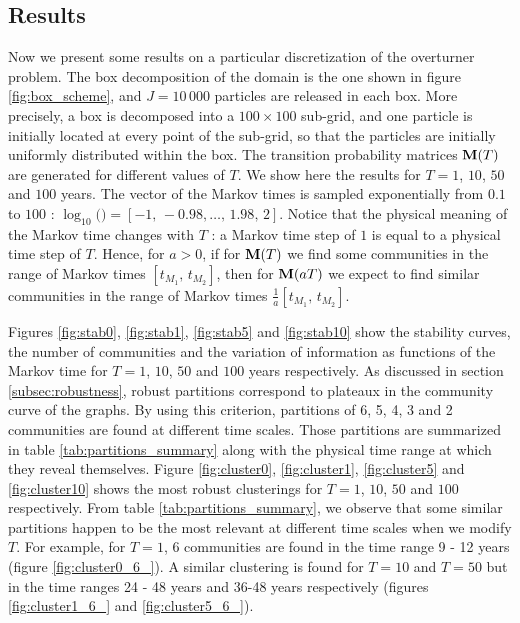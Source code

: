 \subsection{Results}
Now we present some results on a particular discretization of the overturner problem. The box decomposition of the domain is the one shown in figure \ref{fig:box_scheme}, and $J = 10\,000$ particles are released in each box. More precisely, a box is decomposed into a $100 \times 100$ sub-grid, and one particle is initially located at every point of the sub-grid, so that the particles are initially uniformly distributed within the box. The transition probability matrices $\mathbf M(T)$ are generated for different values of $T$. We show here the results for $T = 1$, $10$, $50$ and $100$ years. The vector of the Markov times  is sampled exponentially from $0.1$ to $100$ : $\log_{10}($$) = [-1,\, -0.98, \dots ,\, 1.98,\, 2]$. Notice that the physical meaning of the Markov time changes with $T$ : a Markov time step of $1$ is equal to a physical time step of $T$. Hence, for $a >0$, if for $\mathbf M(T)$ we find some communities in the range of Markov times $[t_{M_1},\, t_{M_2}]$, then for $\mathbf M(aT)$ we expect to find similar communities in the range of Markov times $\frac{1}{a}[t_{M_1},\, t_{M_2}]$.

Figures \ref{fig:stab0}, \ref{fig:stab1}, \ref{fig:stab5} and \ref{fig:stab10} show the stability curves, the number of communities and the variation of information as functions of the Markov time for $T = 1$, $10$, $50$ and $100$ years respectively. As discussed in section \ref{subsec:robustness}, robust partitions correspond to plateaux in the community curve of the graphs. By using this criterion, partitions of 6, 5, 4, 3 and 2 communities are found at different time scales. Those partitions are summarized in table \ref{tab:partitions_summary} along with the physical time range at which they reveal themselves. Figure \ref{fig:cluster0}, \ref{fig:cluster1}, \ref{fig:cluster5} and \ref{fig:cluster10} shows the most robust clusterings for $T=1$, $10$, $50$ and $100$ respectively. From table \ref{tab:partitions_summary}, we observe that some similar partitions happen to be the most relevant at different time scales when we modify $T$. For example, for $T=1$, 6 communities are found in the time range 9 - 12 years (figure \ref{fig:cluster0_6_}). A similar clustering is found for $T = 10$ and $T = 50$ but in the time ranges 24 - 48 years and 36-48 years respectively (figures \ref{fig:cluster1_6_} and \ref{fig:cluster5_6_}).

